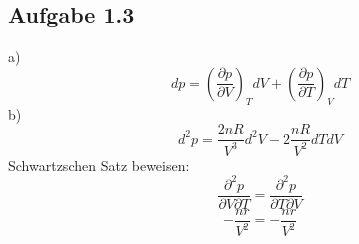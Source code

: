 \documentclass{article}
\begin{document}
\subsection*{Aufgabe 1.3}
a)
\begin{equation*}
    dp = \left(\frac{\partial p}{\partial V}\right)_T dV + \left(\frac{\partial p}{\partial T}\right)_V dT
\end{equation*}
b)
\begin{equation*}
    d^2p=\frac{2nR}{V^3}d^2V-2\frac{nR}{V^2}dTdV
\end{equation*}
Schwartzschen Satz beweisen:
\begin{equation*}
    \frac{\partial^2 p}{\partial V \partial T} = \frac{\partial^2 p}{\partial T \partial V}
\end{equation*}
\begin{equation*}
    -\frac{nr}{V^2} = -\frac{nr}{V^2} 
\end{equation*}
\end{document}
